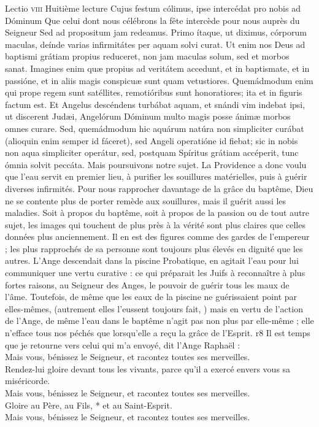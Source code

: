 \documentclass[twoside]{article}
\begin{document}
\begin{paracol}[1]{2}
\lectioresponsorium
	{Lectio \textsc{viii}}
	{Huitième lecture}
	{Cujus festum cólimus, ipse intercédat pro nobis ad Dóminum}
	{Que celui dont nous célébrons la fête intercède pour nous auprès du Seigneur}
	{
		Sed ad propositum jam redeamus. Primo ítaque, ut diximus, córporum maculas, deínde varias infirmitátes per aquam solvi curat. Ut enim nos Deus ad baptismi grátiam propius reduceret, non jam maculas solum, sed et morbos sanat. Imagines enim quæ propius ad veritátem accedunt, et in baptismate, et in passióne, et in aliis magis conspicuæ sunt quam vetustiores. Quemádmodum enim qui prope regem sunt satéllites, remotióribus sunt honoratiores; ita et in figuris factum est. Et Angelus descéndens turbábat aquam, et snándi vim indebat ipsi, ut discerent Judæi, Angelórum Dóminum multo magis posse ánimæ morbos omnes curare. Sed, quemádmodum hic aquárum natúra non simpliciter curábat (alioquin enim semper id fáceret), sed Angeli operatióne id fiebat; sic in nobis non aqua simpliciter operátur, sed, postquam Spíritus grátiam accéperit, tunc ómnia solvit peccáta.
	}
	{
		Mais poursuivons notre sujet. La Providence a donc voulu que l’eau servit en premier lieu, à purifier les souillures matérielles, puis à guérir diverses infirmités. Pour nous rapprocher davantage de la grâce du baptême, Dieu ne se contente plus de porter remède aux souillures, mais il guérit aussi les maladies. Soit à propos du baptême, soit à propos de la passion ou de tout autre sujet, les images qui touchent de plus près à la vérité sont plus claires que celles données plus anciennement. Il en est des figures comme des gardes de l’empereur ; les plus rapprochés de sa personne sont toujours plus élevés en dignité que les autres. L’Ange descendait dans la piscine Probatique, en agitait l’eau pour lui communiquer une vertu curative : ce qui préparait les Juifs à reconnaître à plus fortes raisons, au Seigneur des Anges, le pouvoir de guérir tous les maux de l’âme. Toutefois, de même que les eaux de la piscine ne guérissaient point par elles-mêmes, (autrement elles l’eussent toujours fait, ) mais en vertu de l’action de l’Ange, de même l’eau dans le baptême n’agit pas non plus par elle-même ; elle n’efface tous nos péchés que lorsqu’elle a reçu la grâce de l’Esprit.
	}
	{r8}
	{\rr Il est temps que je retourne vers celui qui m’a envoyé, dit l’Ange Raphaël :\\
	\GreSpecial{*} Mais vous, bénissez le Seigneur, et racontez toutes ses merveilles.\\
	\vv Rendez-lui gloire devant tous les vivants, parce qu’il a exercé envers vous sa miséricorde.\\
	\GreSpecial{*} Mais vous, bénissez le Seigneur, et racontez toutes ses merveilles.\\
	\vv Gloire au Père, au Fils, * et au Saint-Esprit.\\
	\GreSpecial{*} Mais vous, bénissez le Seigneur, et racontez toutes ses merveilles.}
	

\end{paracol}
\end{document}
